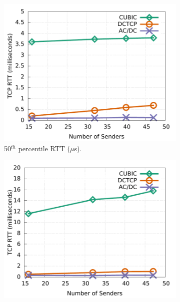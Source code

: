 

\begin{figure}[!t]
        \centering
        \begin{subfigure}[b]{0.33\textwidth}
                \centering
                \includegraphics[width=\textwidth]{figures/incast/plots9k/incast_sockperf50th_vary_sender.pdf}
                \caption{50$^{th}$ percentile RTT ($\mu$s).}
                \label{incast_9k_50th_sockperf}
        \end{subfigure}
        \begin{subfigure}[b]{0.33\textwidth}
                \centering
                \includegraphics[width=\textwidth]{figures/incast/plots9k/incast_sockperf999th_vary_sender.pdf}

\end{subfigure}
\end{figure}
